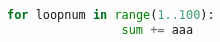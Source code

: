 \documentclass[]{article}
\begin{document}
	\begin{linenumbers}
		\begin{lstlisting}[language=Python]
			for loopnum in range(1..100):
				sum += aaa
		\end{lstlisting}
	\end{linenumbers}
\end{document}
